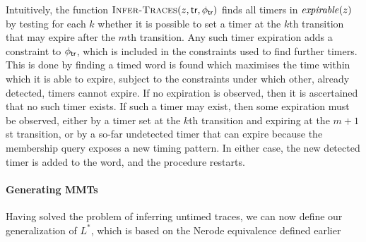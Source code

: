 Intuitively, the function
$\textsc{Infer-Traces}(z,\textsf{tr},\phi_{\textsf{tr}})$ finds
all timers in $\mathit{expirable}(z)$ by testing for each $k$ whether 
it is possible
to set a timer at the $k$th transition that may expire after the
$m$th transition. Any such timer expiration adds a constraint to
$\phi_{\textsf{tr}}$, which is included in the constraints used to find
further timers.
This is done by finding a timed word is found which maximises the
time within which it is able to expire, subject to the constraints under
which other, already detected, timers cannot expire. If no expiration is
observed, then it is ascertained that no such timer exists.
If such a timer may exist, then some expiration must be observed, either
by a timer set at the $k$th transition and expiring at the $m+1$st transition,
or by a so-far undetected timer that can expire because the membership
query exposes a new timing pattern. In either case, the new detected timer
is added to the word, and the procedure restarts.

\paragraph{Generating MMTs}
Having solved the problem of inferring untimed traces, we can now
define our generalization of $L^*$, which is based on the
Nerode equivalence defined earlier


